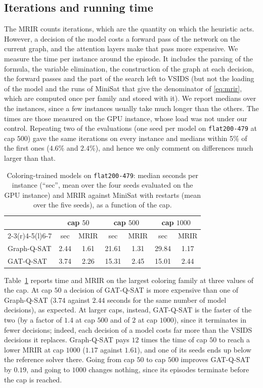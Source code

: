 \documentclass[11pt,a4paper]{article}
\newcommand{\code}[1]{\texttt{\def\_{\textunderscore\allowbreak}#1}}
\begin{document}
\FloatBarrier
\subsection{Iterations and running time}\label{sec:time}

The MRIR counts iterations, which are the quantity on which the heuristic acts.
However, a decision of the model costs a forward pass of the network on the
current graph, and the attention layers make that pass more expensive. We
measure the time per instance around the episode. It includes the
parsing of the formula, the variable elimination, the construction of the graph
at each decision, the forward passes and the part of the search left to VSIDS
(but not the loading of the model and the runs of MiniSat that give
the denominator of \eqref{eq:mrir}, which are computed once per family and
stored with it). We report medians over the instances, since a few instances
usually take much longer than the others. The times are those measured on the GPU
instance, whose load was not under our control. Repeating two of the
evaluations (one seed per model on \code{flat200-479} at cap $500$) gave the same iterations on every instance
and medians within 5\% of the first ones ($4.6$\% and $2.4$\%), and hence we
only comment on differences much larger than that.

\begin{table}[ht]\centering\small
\begin{tabular}{lcc@{\qquad}cc@{\qquad}cc}
\toprule
 & \multicolumn{2}{c}{cap $50$} & \multicolumn{2}{c}{cap $500$} & \multicolumn{2}{c}{cap $1000$} \\
\cmidrule(r){2-3}\cmidrule(r){4-5}\cmidrule(l){6-7}
 & sec & MRIR & sec & MRIR & sec & MRIR \\
\midrule
Graph-Q-SAT & 2.44 & 1.61 & 21.61 & 1.31 & 29.84 & 1.17 \\
GAT-Q-SAT   & 3.74 & 2.26 & 15.31 & 2.45 & 15.01 & 2.44 \\
\bottomrule
\end{tabular}
\caption{Coloring-trained models on \code{flat200-479}: median seconds per
instance (``sec'', mean over the four seeds evaluated on the GPU instance) and
MRIR against MiniSat with restarts (mean over the five seeds), as a function of
the cap.}
\label{tab:budget}
\end{table}

\noindent
Table~\ref{tab:budget} reports time and MRIR on the largest coloring family at
three values of the cap. At cap $50$ a decision of GAT-Q-SAT is more expensive
than one of Graph-Q-SAT ($3.74$ against $2.44$ seconds for the same number
of model decisions), as expected. At larger caps, instead, GAT-Q-SAT is the
faster of the two (by a factor of $1.4$ at cap $500$ and of $2$ at cap $1000$), since it terminates in fewer decisions; indeed, each decision of a
model costs far more than the VSIDS decisions it replaces. Graph-Q-SAT pays
$12$ times the time of cap $50$ to reach a lower MRIR at cap $1000$ ($1.17$
against $1.61$), and one of its seeds ends up below the reference solver
there. Going from cap $50$ to cap $500$ improves
GAT-Q-SAT by $0.19$, and going to $1000$ changes nothing, since its episodes
terminate before the cap is reached.
\end{document}
